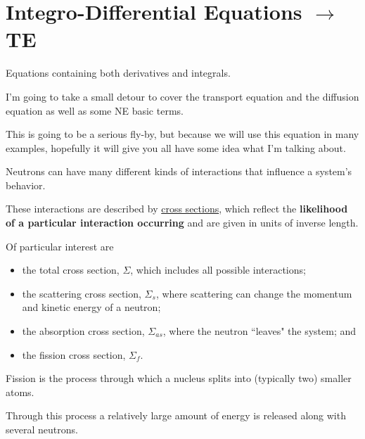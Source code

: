 \documentclass[12pt]{article}
\newcommand{\Macro}{\ensuremath{\Sigma}}
\begin{document}



\section{Integro-Differential Equations $\rightarrow$ TE}

Equations containing both derivatives and integrals. 

I'm going to take a small detour to cover the transport equation and the diffusion equation as well as some NE basic terms. 

This is going to be a serious fly-by,  but because we will use this equation in many examples, hopefully it will give you all have some idea what I'm talking about.

Neutrons can have many different kinds of interactions that influence a system's behavior. 

These interactions are described by \underline{cross sections}, which reflect the \textbf{likelihood of a particular interaction occurring} and are given in units of inverse length. 

Of particular interest are
\begin{itemize}
\item the total cross section, $\Macro$, which includes all possible interactions; 
\item the scattering cross section, $\Macro_{s}$, where scattering can change the momentum and kinetic energy of a neutron; 
\item the absorption cross section, $\Macro_{as}$, where the neutron ``leaves" the system; and 
\item the fission cross section, $\Macro_{f}$. 
\end{itemize}   

Fission is the process through which a nucleus splits into (typically two) smaller atoms. 

Through this process a relatively large amount of energy is released along with several neutrons. 
\end{document}
